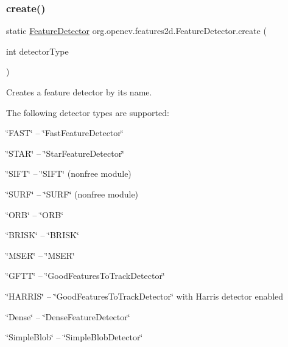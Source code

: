 \subsubsection{\texorpdfstring{create()}{create()}}
{\footnotesize\ttfamily static \mbox{\hyperlink{classorg_1_1opencv_1_1features2d_1_1_feature_detector}{Feature\+Detector}} org.\+opencv.\+features2d.\+Feature\+Detector.\+create (\begin{DoxyParamCaption}\item[{int}]{detector\+Type }\end{DoxyParamCaption})\hspace{0.3cm}{\ttfamily [static]}}

Creates a feature detector by its name.

The following detector types are supported\+:


\begin{DoxyItemize}
\item {\ttfamily \char`\"{}\+F\+A\+S\+T\char`\"{}} -- \char`\"{}\+Fast\+Feature\+Detector\char`\"{} 
\item {\ttfamily \char`\"{}\+S\+T\+A\+R\char`\"{}} -- \char`\"{}\+Star\+Feature\+Detector\char`\"{} 
\item {\ttfamily \char`\"{}\+S\+I\+F\+T\char`\"{}} -- \char`\"{}\+S\+I\+F\+T\char`\"{} (nonfree module) 
\item {\ttfamily \char`\"{}\+S\+U\+R\+F\char`\"{}} -- \char`\"{}\+S\+U\+R\+F\char`\"{} (nonfree module) 
\item {\ttfamily \char`\"{}\+O\+R\+B\char`\"{}} -- \char`\"{}\+O\+R\+B\char`\"{} 
\item {\ttfamily \char`\"{}\+B\+R\+I\+S\+K\char`\"{}} -- \char`\"{}\+B\+R\+I\+S\+K\char`\"{} 
\item {\ttfamily \char`\"{}\+M\+S\+E\+R\char`\"{}} -- \char`\"{}\+M\+S\+E\+R\char`\"{} 
\item {\ttfamily \char`\"{}\+G\+F\+T\+T\char`\"{}} -- \char`\"{}\+Good\+Features\+To\+Track\+Detector\char`\"{} 
\item {\ttfamily \char`\"{}\+H\+A\+R\+R\+I\+S\char`\"{}} -- \char`\"{}\+Good\+Features\+To\+Track\+Detector\char`\"{} with Harris detector enabled 
\item {\ttfamily \char`\"{}\+Dense\char`\"{}} -- \char`\"{}\+Dense\+Feature\+Detector\char`\"{} 
\item {\ttfamily \char`\"{}\+Simple\+Blob\char`\"{}} -- \char`\"{}\+Simple\+Blob\+Detector\char`\"{} 
\end{DoxyItemize}

